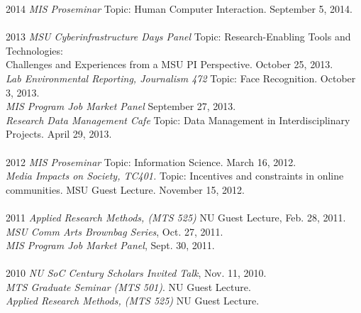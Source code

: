 \documentclass[9pt]{extarticle}
\begin{document}
\begin{tabbing}
2014 \hspace{0.3in}\=  \emph{MIS Proseminar} Topic: Human Computer Interaction. September 5, 2014.\\\\

2013 \hspace{0.3in}\=  \emph{MSU Cyberinfrastructure Days Panel} Topic: Research-Enabling Tools and Technologies:\\
\> \hspace{0.5cm} Challenges and Experiences from a MSU PI Perspective. October 25, 2013.\\ 
\> \emph{Lab Environmental Reporting, Journalism 472} Topic: Face Recognition. October 3, 2013. \\
\> \emph{MIS Program Job Market Panel} September 27, 2013. \\
\> \emph{Research Data Management Cafe} Topic: Data Management in Interdisciplinary \\
\> \hspace{0.5cm} Projects. April 29, 2013. \\\\ %

2012 \hspace{0.3in}\=  \emph{MIS Proseminar} Topic: Information Science. March 16, 2012.\\
\> \emph{Media Impacts on Society, TC401.} Topic: Incentives and constraints in online \\
\> \hspace{0.5cm} communities. MSU Guest Lecture. November 15, 2012. \\\\

2011 \hspace{0.3in}\= \emph{Applied Research Methods, (MTS 525)} NU Guest Lecture, Feb. 28, 2011. \\
\> \emph{MSU Comm Arts Brownbag Series}, Oct. 27, 2011. \\
\> \emph{MIS Program Job Market Panel}, Sept. 30, 2011. \\\\

2010 \hspace{0.3in}\= \emph{NU SoC Century Scholars Invited Talk}, Nov. 11, 2010. \\
\> \emph{MTS Graduate Seminar (MTS 501)}. NU Guest Lecture. \\
\> \emph{Applied Research Methods, (MTS 525)} NU Guest Lecture. \\\\


\end{tabbing}
\end{document}
